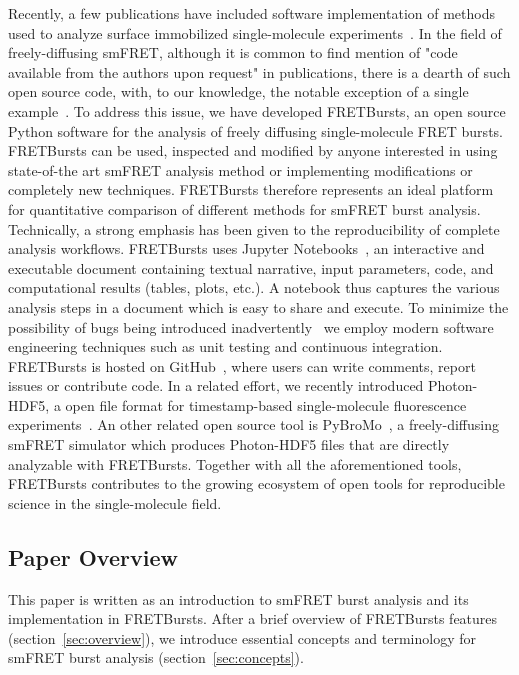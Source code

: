 Recently, a few publications have included software implementation of methods used to analyze
surface immobilized single-molecule experiments~\cite{Bronson_2009,Greenfeld_2012, K_nig_2013}.
In the field of freely-diffusing smFRET, although it is common to find mention of "code available from the authors upon request" in publications, there is a dearth of such open source code, with, to our knowledge, the notable exception of a single example~\cite{Murphy2014}.
To address this issue, we have developed FRETBursts,
an open source Python software for the analysis of freely diffusing single-molecule FRET bursts.
FRETBursts can be used, inspected and modified by anyone interested in using state-of-the art smFRET analysis method or implementing modifications or completely new techniques. FRETBursts therefore represents an ideal platform
for quantitative comparison of different methods for smFRET burst analysis.
Technically, a strong emphasis has been given to the reproducibility of complete analysis
workflows. FRETBursts uses Jupyter Notebooks~\cite{Shen_2014},
an interactive and executable document containing textual narrative, input parameters, 
code, and computational results (tables, plots, etc.). A notebook thus captures the various analysis steps
in a document which is easy to share and execute.
To minimize the possibility of bugs being introduced inadvertently~\cite{Soergel_2015} 
we employ modern software engineering techniques
such as unit testing and continuous integration.
FRETBursts is hosted on GitHub~\cite{Blischak_2016,Prli__2012},
where users can write comments, report issues or contribute code.
In a related effort, we recently introduced Photon-HDF5,
a open file format for timestamp-based single-molecule fluorescence
experiments~\cite{Ingargiola2016}. An other related open source tool is PyBroMo~\cite{Ingargiola_2016},
a freely-diffusing smFRET simulator which produces Photon-HDF5 files that are
directly analyzable with FRETBursts.
Together with all the aforementioned tools, FRETBursts contributes to the growing 
ecosystem of open tools for reproducible science in the single-molecule field.

\subsection{Paper Overview}
This paper is written as an introduction to smFRET burst analysis and its implementation in FRETBursts.
After a brief overview of FRETBursts features (section~\ref{sec:overview}),
we introduce essential concepts and terminology for smFRET burst analysis 
(section~\ref{sec:concepts}).

